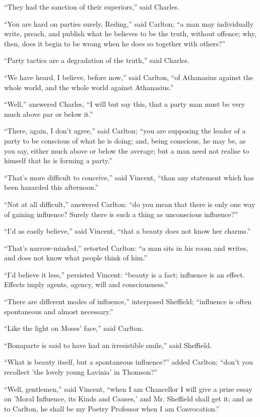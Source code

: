 ``They had the sanction of their superiors,'' said Charles.

``You are hard on parties surely, Reding,'' said Carlton;
``a man may individually write, preach, and publish what he
believes to be the truth, without offence; why, then, does it begin to
be wrong when he does so together with others?''

``Party tactics are a degradation of the truth,'' said
Charles.

``We have heard, I believe, before now,'' said Carlton,
``of Athanasius against the whole world, and the whole world
against Athanasius.''

``Well,'' answered Charles, ``I will but say this, that
a party man must be very much above par or below it.''

``There, again, I don't agree,'' said Carlton; ``you
are supposing the leader of a party to be conscious of what he is
doing; and, being conscious, he may be, as you say, either much
above or below the average; but a man need not realise to himself that
he is forming a party.''

``That's more difficult to conceive,'' said Vincent,
``than any statement which has been hazarded this afternoon.''

``Not at all difficult,'' answered Carlton: ``do you
mean that there is only one way of gaining influence? Surely there is
such a thing as unconscious influence?''

``I'd as easily believe,'' said Vincent, ``that a
beauty does not know her charms.''

``That's narrow-minded,'' retorted Carlton: ``a man
sits in his room and writes, and does not know what people think of
him.''

``I'd believe it less,'' persisted Vincent: ``beauty is
a fact; influence is an effect. Effects imply agents, agency, will and
consciousness.''

``There are different modes of influence,'' interposed
Sheffield; ``influence is often spontaneous and almost
necessary.''

``Like the light on Moses' face,'' said Carlton.

``Bonaparte is said to have had an irresistible smile,''
said Sheffield.

``What is beauty itself, but a spontaneous influence?''
added Carlton; ``don't you recollect 'the lovely young Lavinia' in
Thomson?''

``Well, gentlemen,'' said Vincent, ``when I am
Chancellor I will give a prize essay on 'Moral Influence, its Kinds
and Causes,' and Mr. Sheffield shall get it; and as to Carlton, he
shall be my Poetry Professor when I am Convocation.''


